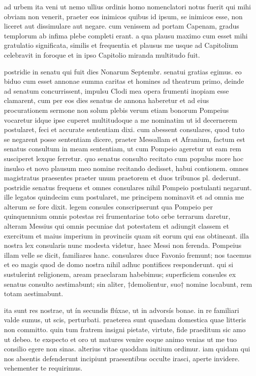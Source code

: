  ad urbem ita veni ut nemo ullius ordinis homo nomenclatori notus fuerit qui mihi obviam non venerit, praeter eos inimicos quibus id ipsum, se inimicos esse, non liceret aut dissimulare aut negare. cum venissem ad portam Capenam, gradus templorum ab infima plebe completi erant. a qua plausu maximo cum esset mihi gratulatio significata, similis et frequentia et plausus me usque ad Capitolium celebravit in foroque et in ipso Capitolio miranda multitudo fuit.

 postridie in senatu qui fuit dies Nonarum Septembr. senatui gratias egimus. eo biduo cum esset annonae summa caritas et homines ad theatrum primo, deinde ad senatum concurrissent, impulsu Clodi mea opera frumenti inopiam esse clamarent, cum per eos dies senatus de annona haberetur et ad eius procurationem sermone non solum plebis verum etiam bonorum Pompeius vocaretur idque ipse cuperet multitudoque a me nominatim ut id decernerem postularet, feci et accurate sententiam dixi. cum abessent consulares, quod tuto se negarent posse sententiam dicere, praeter Messallam et Afranium, factum est senatus consultum in meam sententiam, ut cum Pompeio ageretur ut eam rem susciperet lexque ferretur. quo senatus consulto recitato cum populus more hoc insulso et novo plausum meo nomine recitando dedisset, habui contionem. omnes magistratus praesentes praeter unum praetorem et duos tribunos pl. dederunt. postridie senatus frequens et omnes consulares nihil Pompeio postulanti negarunt. ille legatos quindecim cum postularet, me principem nominavit et ad omnia me alterum se fore dixit. legem consules conscripserunt qua Pompeio per quinquennium omnis potestas rei frumentariae toto orbe terrarum daretur, alteram Messius qui omnis pecuniae dat potestatem et adiungit classem et exercitum et maius imperium in provinciis quam sit eorum qui eas obtineant. illa nostra lex consularis nunc modesta videtur, haec Messi non ferenda. Pompeius illam velle se dicit, familiares hanc. consulares duce Favonio fremunt; nos tacemus et eo magis quod de domo nostra nihil adhuc pontifices responderunt. qui si sustulerint religionem, aream praeclaram habebimus; superficiem consules ex senatus consulto aestimabunt; sin aliter, †demolientur, suo† nomine locabunt, rem totam aestimabunt.

 ita sunt res nostrae, ut ín secundis flúxae, ut in advorsís bonae. in re familiari valde sumus, ut scis, perturbati. praeterea sunt quaedam domestica quae litteris non committo. quin tum fratrem insigni pietate, virtute, fide praeditum sic amo ut debeo. te exspecto et oro ut matures venire eoque animo venias ut me tuo consilio egere non sinas. alterius vitae quoddam initium ordimur. iam quidam qui nos absentis defenderunt incipiunt praesentibus occulte irasci, aperte invidere. vehementer te requirimus.
